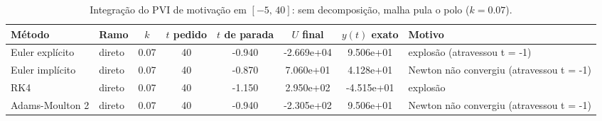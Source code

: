 \begin{table}[H]
    \centering
    \small
    \begin{tabular}{llcccccl}
        \hline
        Método & Ramo & $k$ & $t$ pedido & $t$ de parada & $U$ final & $y(t)$ exato & Motivo \\
        \hline
        Euler explícito & direto & 0.07 & 40 & -0.940 & -2.669e+04 & 9.506e+01 & explosão (atravessou t = -1) \\
        Euler implícito & direto & 0.07 & 40 & -0.870 & 7.060e+01 & 4.128e+01 & Newton não convergiu (atravessou t = -1) \\
        RK4 & direto & 0.07 & 40 & -1.150 & 2.950e+02 & -4.515e+01 & explosão \\
        Adams-Moulton 2 & direto & 0.07 & 40 & -0.940 & -2.305e+02 & 9.506e+01 & Newton não convergiu (atravessou t = -1) \\
        \hline
    \end{tabular}
    \caption{Integração do PVI de motivação em $[-5,\, 40]$: sem decomposição, malha pula o polo ($k = 0.07$).}
    \label{tab:m5_40_sem_decomp_pula_polo}
\end{table}
